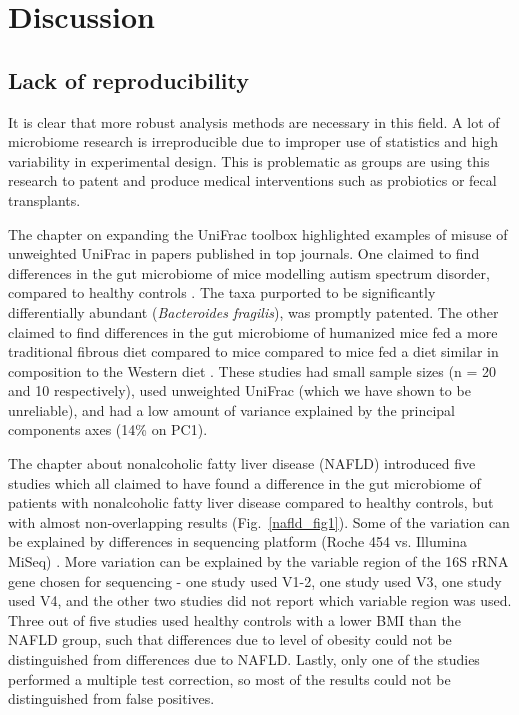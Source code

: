 \chapter{Discussion}

\section{Lack of reproducibility}
It is clear that more robust analysis methods are necessary in this field. A lot of microbiome research is irreproducible due to improper use of statistics and high variability in experimental design. This is problematic as groups are using this research to patent and produce medical interventions such as probiotics or fecal transplants.

The chapter on expanding the UniFrac toolbox highlighted examples of misuse of unweighted UniFrac in papers published in top journals. One claimed to find differences in the gut microbiome of mice modelling autism spectrum disorder, compared to healthy controls \cite{hsiao2013microbiota}. The taxa purported to be significantly differentially abundant (\textit{Bacteroides fragilis}), was promptly patented. The other claimed to find differences in the gut microbiome of humanized mice fed a more traditional fibrous diet compared to mice compared to mice fed a diet similar in composition to the Western diet \cite{sonnenburg2016diet}. These studies had small sample sizes (n = 20 and 10 respectively), used unweighted UniFrac (which we have shown to be unreliable), and had a low amount of variance explained by the principal components axes (14\% on PC1).

The chapter about nonalcoholic fatty liver disease (NAFLD) introduced five studies which all claimed to have found a difference in the gut microbiome of patients with nonalcoholic fatty liver disease compared to healthy controls, but with almost non-overlapping results (Fig.~\ref{nafld_fig1}). Some of the variation can be explained by differences in sequencing platform (Roche 454 vs. Illumina MiSeq) \cite{di2013high}. More variation can be explained by the variable region of the 16S rRNA gene chosen for sequencing - one study used V1-2, one study used V3, one study used V4, and the other two studies did not report which variable region was used. Three out of five studies used healthy controls with a lower BMI than the NAFLD group, such that differences due to level of obesity could not be distinguished from differences due to NAFLD. Lastly, only one of the studies performed a multiple test correction, so most of the results could not be distinguished from false positives.

